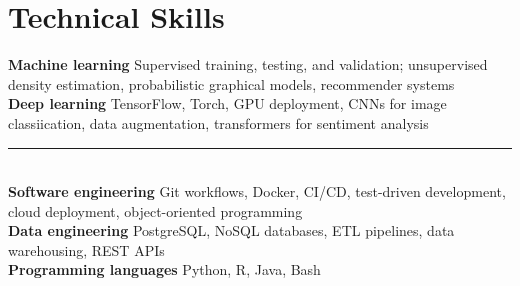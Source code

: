 \documentclass[10pt]{article}
\begin{document}
{
	\section{Technical Skills}
		\textbf{Machine learning} Supervised training, testing, and validation; unsupervised density estimation, probabilistic graphical models, recommender systems \\
		\textbf{Deep learning} TensorFlow, Torch, GPU deployment, CNNs for image classiication, data augmentation, transformers for sentiment analysis

		\rule{7.55cm}{0.2pt} \\

		\vspace{-4pt}
		\textbf{Software engineering} Git workflows, Docker, CI/CD, test-driven development, cloud deployment, object-oriented programming \\
		\textbf{Data engineering} PostgreSQL, NoSQL databases, ETL pipelines, data warehousing, REST APIs \\
		\textbf{Programming languages} Python, R, Java, Bash
}
\end{document}
